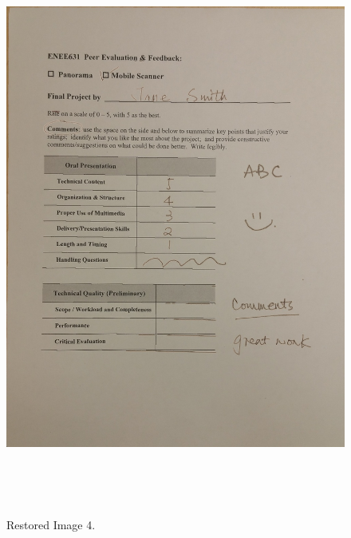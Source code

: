 \begin{figure}[th]
	\centering
	\includegraphics[height=19cm ]{Figures/test_restored_image}
	\caption[Restored Image 4]{Restored Image 4.}
	\label{fig:RestoredImage4}
\end{figure}
\pagebreak

